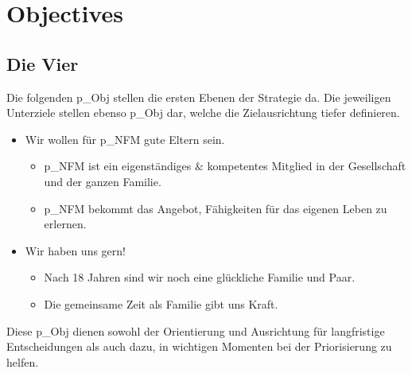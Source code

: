 
\pagebreak

\section{Objectives} 

\subsection{Die Vier}

Die folgenden \gls{p_Obj} stellen die ersten Ebenen der Strategie da. Die jeweiligen Unterziele stellen ebenso \gls{p_Obj} dar, welche die Zielausrichtung tiefer definieren.

\begin{itemize}
	\item Wir wollen für \gls{p_NFM} gute Eltern sein.
	\begin{itemize}
	\item \gls{p_NFM} ist ein eigenständiges $\&$ kompetentes Mitglied in der Gesellschaft und der ganzen Familie. \label{NFM_O_1}
	\item \gls{p_NFM} bekommt das Angebot, Fähigkeiten für das eigenen Leben zu erlernen. \label{NFM_O_2}
	\end{itemize}
	\item Wir haben uns gern!
	\begin{itemize}
	\item Nach 18 Jahren sind wir noch eine glückliche Familie und Paar.\label{NFM_O_4}
 	\item Die gemeinsame Zeit als Familie gibt uns Kraft. \label{NFM_O_3}
	\end{itemize}
\end{itemize}


Diese \gls{p_Obj} dienen sowohl der Orientierung und Ausrichtung für langfristige Entscheidungen als auch dazu, in wichtigen Momenten bei der Priorisierung zu helfen.\\


